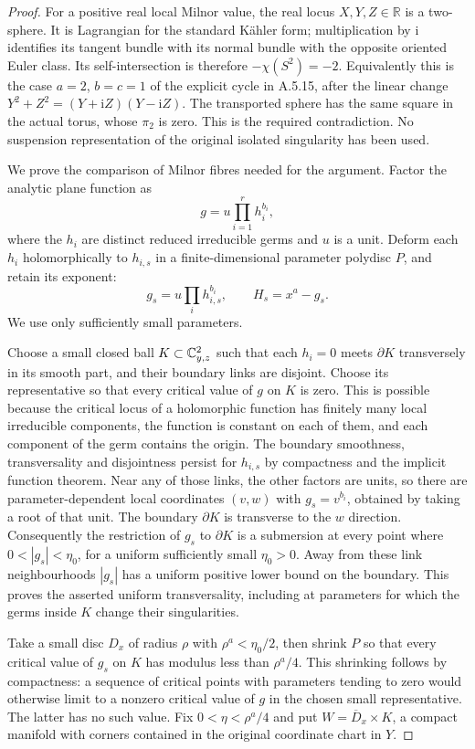 \begin{proof}
For a positive real local Milnor value, the real
locus $X,Y,Z\in\mathbb R$ is a two-sphere. It is
Lagrangian for the standard K\"ahler form; multiplication
by $\mathrm i$ identifies its tangent bundle with
its normal bundle with the opposite oriented Euler
class. Its self-intersection is therefore
$-\chi(S^2)=-2$. Equivalently this is the case
$a=2$, $b=c=1$ of the explicit cycle in A.5.15,
after the linear change $Y^2+Z^2=(Y+\mathrm iZ)(Y-\mathrm iZ)$.
The transported sphere has the same square in the
actual torus, whose $\pi_2$ is zero. This is the
required contradiction. No suspension representation
of the original isolated singularity has been used.

We prove the comparison of Milnor fibres needed for
the argument. Factor the analytic plane function as
\[
                   g=u\prod_{i=1}^r h_i^{b_i},
\]
where the $h_i$ are distinct reduced irreducible
germs and $u$ is a unit. Deform each $h_i$
holomorphically to $h_{i,s}$ in a finite-dimensional
parameter polydisc $P$, and retain its exponent:
\[
 g_s=u\prod_i h_{i,s}^{b_i},\qquad
 H_s=x^a-g_s.                                    \tag{A.J.39}
\]
We use only sufficiently small parameters.

Choose a small closed ball $K\subset\mathbb C^2_{y,z}$
such that each $h_i=0$ meets $\partial K$
transversely in its smooth part, and their boundary
links are disjoint. Choose its representative so
that every critical value of $g$ on $K$ is zero.
This is possible because the critical locus of a
holomorphic function has finitely many local
irreducible components, the function is constant
on each of them, and each component of the germ
contains the origin. The boundary smoothness,
transversality and disjointness persist for
$h_{i,s}$ by compactness and the implicit function
theorem. Near any of those links, the other factors
are units, so there are parameter-dependent local
coordinates $(v,w)$ with $g_s=v^{b_i}$, obtained
by taking a root of that unit. The boundary
$\partial K$ is transverse to the $w$ direction.
Consequently the restriction of $g_s$ to
$\partial K$ is a submersion at every point where
$0<|g_s|<\eta_0$, for a uniform sufficiently small
$\eta_0>0$. Away from these link neighbourhoods
$|g_s|$ has a uniform positive lower bound on the
boundary. This proves the asserted uniform
transversality, including at parameters for which
the germs inside $K$ change their singularities.

Take a small disc $D_x$ of radius $\rho$ with
$\rho^a<\eta_0/2$, then shrink $P$ so that every
critical value of $g_s$ on $K$ has modulus less than
$\rho^a/4$. This shrinking follows by compactness:
a sequence of critical points with parameters
tending to zero would otherwise limit to a
nonzero critical value of $g$ in the chosen small
representative. The latter has no such value.
Fix $0<\eta<\rho^a/4$ and put
$W=\overline D_x\times K$, a compact manifold
with corners contained in the original coordinate
chart in $Y$.


\end{proof}
